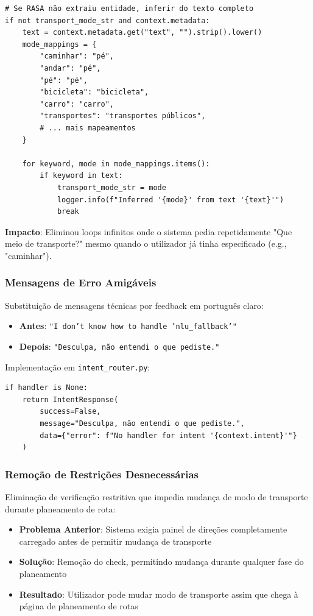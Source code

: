 \documentclass{report}
\begin{document}
\begin{verbatim}
# Se RASA não extraiu entidade, inferir do texto completo
if not transport_mode_str and context.metadata:
    text = context.metadata.get("text", "").strip().lower()
    mode_mappings = {
        "caminhar": "pé",
        "andar": "pé",
        "pé": "pé",
        "bicicleta": "bicicleta",
        "carro": "carro",
        "transportes": "transportes públicos",
        # ... mais mapeamentos
    }
    
    for keyword, mode in mode_mappings.items():
        if keyword in text:
            transport_mode_str = mode
            logger.info(f"Inferred '{mode}' from text '{text}'")
            break
\end{verbatim}

\textbf{Impacto}: Eliminou loops infinitos onde o sistema pedia repetidamente "Que meio de transporte?" mesmo quando o utilizador já tinha especificado (e.g., "caminhar").

\subsubsection{Mensagens de Erro Amigáveis}

Substituição de mensagens técnicas por feedback em português claro:

\begin{itemize}
    \item \textbf{Antes}: \texttt{"I don't know how to handle 'nlu\_fallback'"}
    \item \textbf{Depois}: \texttt{"Desculpa, não entendi o que pediste."}
\end{itemize}

Implementação em \texttt{intent\_router.py}:

\begin{verbatim}
if handler is None:
    return IntentResponse(
        success=False,
        message="Desculpa, não entendi o que pediste.",
        data={"error": f"No handler for intent '{context.intent}'"}
    )
\end{verbatim}

\subsubsection{Remoção de Restrições Desnecessárias}

Eliminação de verificação restritiva que impedia mudança de modo de transporte durante planeamento de rota:

\begin{itemize}
    \item \textbf{Problema Anterior}: Sistema exigia painel de direções completamente carregado antes de permitir mudança de transporte
    \item \textbf{Solução}: Remoção do check, permitindo mudança durante qualquer fase do planeamento
    \item \textbf{Resultado}: Utilizador pode mudar modo de transporte assim que chega à página de planeamento de rotas
\end{itemize}
\end{document}

